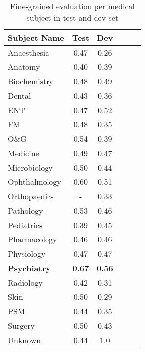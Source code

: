 \documentclass[pmlr,twocolumn,10pt]{jmlr}
\begin{document}
\begin{table}[!ht]
\small
\centering
\begin{tabular}{l|ccccc}
\toprule
 {\bf Subject Name} & {\bf Test} & {\bf Dev} \\
\midrule
Anaesthesia  &  0.47 & 0.26  \\
Anatomy      &  0.40 & 0.39  \\
Biochemistry &  0.48 & 0.49  \\
Dental       &  0.43 & 0.36  \\
ENT          &  0.47 & 0.52  \\
FM           &  0.48 & 0.35  \\
O\&G         &  0.54 & 0.39  \\
Medicine     &  0.49 & 0.47  \\
Microbiology &  0.50 & 0.44  \\
Ophthalmology&  0.60 & 0.51  \\
Orthopaedics &  -    & 0.33  \\
Pathology    &  0.53 & 0.46  \\
Pediatrics   &  0.39 & 0.45  \\

Pharmacology &  0.46 & 0.46  \\
Physiology   &  0.47 & 0.47  \\
\rowcolor{rowgray}
\textbf{Psychiatry}   &  \textbf{0.67} & \textbf{0.56}  \\
Radiology    &  0.42 & 0.31  \\
Skin         &  0.50 & 0.29  \\
PSM          &  0.44 & 0.35  \\
Surgery      &  0.50 & 0.43  \\
Unknown      &  0.44 & 1.0 \\

\bottomrule
\end{tabular}
\caption{Fine-grained evaluation per medical subject in test and dev set}
\label{tab:subject_wise}
\vspace{-2ex}
\end{table}
\end{document}
